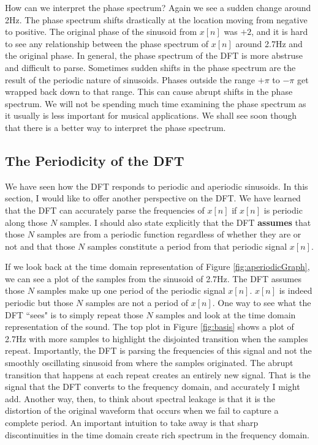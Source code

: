 How can we interpret the phase spectrum?  Again we see a sudden change around 2Hz.  The phase spectrum shifts
drastically at the location moving from negative to positive.  The original phase of the sinusoid from $x[n]$ was $+2$,
and it is hard to see any relationship between the phase spectrum of $x[n]$ around 2.7Hz and the original phase.  In 
general, the phase spectrum of the DFT is more abstruse and difficult to parse.  Sometimes sudden shifts in the
phase spectrum are the result of the periodic nature of sinusoids.  Phases outside the range $+\pi$ to $-\pi$ get
wrapped back down to that range.  This can cause abrupt shifts in the phase spectrum.  We will not be spending
much time examining the phase spectrum as it usually is less important for musical applications. We shall see soon
though that there is a better way to interpret the phase spectrum.

\subsection*{The Periodicity of the DFT}

We have seen how the DFT responds to periodic and aperiodic sinusoids.  In this section, I would like to offer 
another perspective on the DFT.  We have learned that the DFT can accurately parse the frequencies of $x[n]$ if
$x[n]$ is periodic along those $N$ samples.  I should also state explicitly that the DFT \textbf{assumes} that
those $N$ samples are from a periodic function regardless of whether they are or not and that those $N$ samples
constitute a period from that periodic signal $x[n]$.  

If we look back at the time
domain representation of Figure \ref{fig:aperiodicGraph}, we can see a plot of the samples from the sinusoid of
2.7Hz.  The DFT assumes those $N$ samples make up one period of the periodic signal $x[n]$.  $x[n]$
is indeed periodic but those $N$ samples are not a period of $x[n]$.  One way to see what the DFT ``sees" is to
simply repeat those $N$ samples and look at the time domain representation of the sound.  The top plot in Figure
\ref{fig:basis} shows a plot of 2.7Hz with more samples to highlight the disjointed transition when the samples
repeat.  Importantly, the DFT is parsing the frequencies of this signal and not the smoothly oscillating sinusoid 
from where the samples originated.  The abrupt transition that happens at each repeat creates an entirely new signal.  
That is the signal that the DFT converts to the frequency domain, and accurately I might add.  Another way, then,
to think about spectral leakage is that it is the distortion of the original waveform that occurs when we fail
to capture a complete period.  An important intuition to take away is that sharp discontinuities in the time domain
create rich spectrum in the frequency domain.

